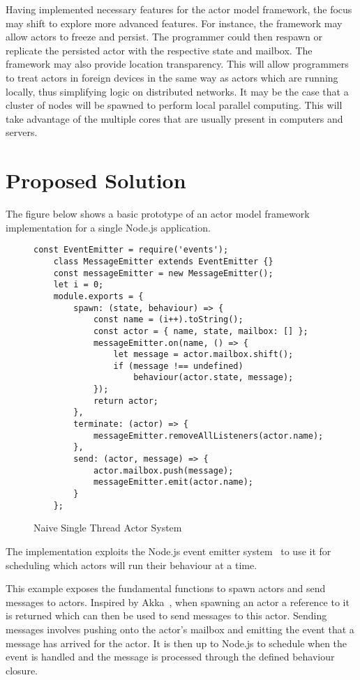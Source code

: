 \documentclass{report}
\begin{document}
Having implemented necessary features for the actor model framework, the focus may shift to explore more advanced features. For instance, the framework may allow actors to freeze and persist. The programmer could then respawn or replicate the persisted actor with the respective state and mailbox. The framework may also provide location transparency. This will allow programmers to treat actors in foreign devices in the same way as actors which are running locally, thus simplifying logic on distributed networks. It may be the case that a cluster of nodes will be spawned to perform local parallel computing. This will take advantage of the multiple cores that are usually present in computers and servers.

\section{Proposed Solution}
The figure below shows a basic prototype of an actor model framework implementation for a single Node.js application.
\begin{figure}[H]
  \begin{lstlisting}[gobble=2]
    const EventEmitter = require('events');
    class MessageEmitter extends EventEmitter {}
    const messageEmitter = new MessageEmitter();
    let i = 0;
    module.exports = {
        spawn: (state, behaviour) => {
            const name = (i++).toString();
            const actor = { name, state, mailbox: [] };
            messageEmitter.on(name, () => {
                let message = actor.mailbox.shift();
                if (message !== undefined)
                    behaviour(actor.state, message);
            });
            return actor;
        },
        terminate: (actor) => {
            messageEmitter.removeAllListeners(actor.name);
        },
        send: (actor, message) => {
            actor.mailbox.push(message);
            messageEmitter.emit(actor.name);
        }
    };
  \end{lstlisting}
  \caption{Naive Single Thread Actor System}
\end{figure}
The implementation exploits the Node.js event emitter system~\cite{nodeevents} to use it for scheduling which actors will run their behaviour at a time.

This example exposes the fundamental functions to spawn actors and send messages to actors. Inspired by Akka~\cite{stivan2015akka}, when spawning an actor a reference to it is returned which can then be used to send messages to this actor. Sending messages involves pushing onto the actor's mailbox and emitting the event that a message has arrived for the actor. It is then up to Node.js to schedule when the event is handled and the message is processed through the defined behaviour closure.
\end{document}
